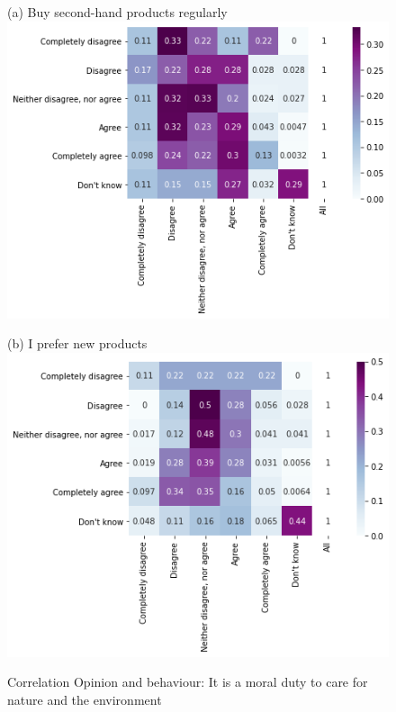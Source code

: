 \documentclass[12pt]{article}
\begin{document}
\begin{figure}[h!!]
	\centering	
	\caption{Correlation Opinion and behaviour: It is a moral duty to care for nature and the environment}\label{fig:behaviour_opinion:moral}	
	\begin{minipage}[h!!]{0.32\textwidth}  
		\centering\footnotesize{(a) Buy second-hand products regularly}
		\includegraphics[width=1\textwidth]{../codding_data/results/liss/conditional_heatmap183_135labels0.png}
	\end{minipage}
	\begin{minipage}[h!!]{0.32\textwidth}
		\centering\footnotesize{(b) I prefer new products}
		\includegraphics[width=1\textwidth]{../codding_data/results/liss/conditional_heatmap183_148labels0.png}

\end{minipage}
\end{figure}
\end{document}
